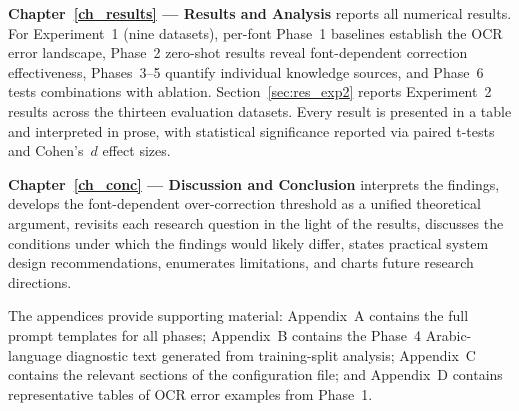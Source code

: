 \textbf{Chapter~\ref{ch_results} --- Results and Analysis}
reports all numerical results. For Experiment~1 (nine datasets), per-font
Phase~1 baselines establish the OCR error landscape, Phase~2 zero-shot
results reveal font-dependent correction effectiveness, Phases~3--5 quantify
individual knowledge sources, and Phase~6 tests combinations with ablation.
Section~\ref{sec:res_exp2} reports Experiment~2 results across the thirteen
evaluation datasets. Every result is presented in a table and interpreted in
prose, with statistical significance reported via paired t-tests and Cohen's~$d$
effect sizes.

\textbf{Chapter~\ref{ch_conc} --- Discussion and Conclusion}
interprets the findings, develops the font-dependent over-correction
threshold as a unified theoretical argument, revisits each research question
in the light of the results, discusses the conditions under which the findings
would likely differ, states practical system design recommendations, enumerates
limitations, and charts future research directions.

The appendices provide supporting material: Appendix~A contains the full
prompt templates for all phases; Appendix~B contains the Phase~4
Arabic-language diagnostic text generated from training-split analysis;
Appendix~C contains the relevant sections of the configuration file; and
Appendix~D contains representative tables of OCR error examples from Phase~1.
